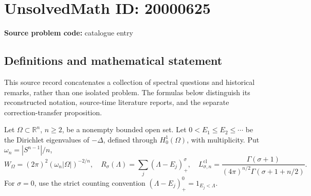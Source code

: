 \documentclass[11pt]{article}
\newcommand{\R}{\mathbb{R}}
\begin{document}
\section*{UnsolvedMath ID: 20000625}
\textbf{Source problem code:} catalogue entry
\subsection{Definitions and mathematical statement}
This source record concatenates a collection of spectral questions and historical remarks, rather than one isolated problem. The formulas below distinguish its reconstructed notation, source-time literature reports, and the separate correction-transfer proposition.

Let \(\Omega\subset\R^n\), \(n\geq2\), be a nonempty bounded open set. Let \(0<E_1\leq E_2\leq\cdots\) be the Dirichlet eigenvalues of \(-\Delta\), defined through \(H^1_0(\Omega)\), with multiplicity. Put \(\omega_n=|S^{n-1}|/n\),
\[
 W_\Omega=(2\pi)^2(\omega_n|\Omega|)^{-2/n},\quad
 R_\sigma(\Lambda)=\sum_j(\Lambda-E_j)_+^\sigma,\quad
 L_{\sigma,n}^{\mathrm{cl}}=\frac{\Gamma(\sigma+1)}{(4\pi)^{n/2}\Gamma(\sigma+1+n/2)}.
\]
For \(\sigma=0\), use the strict counting convention \((\Lambda-E_j)_+^0=1_{E_j<\Lambda}\).
\end{document}
